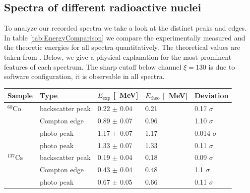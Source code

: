 \subsection*{Spectra of different radioactive nuclei}
%
To analyze our recorded spectra we take a look at the distinct peaks and edges.
In table \ref{tab:EnergyComparison} we compare the experimentally measured and the theoretic energies for all spectra quantitatively.
The theoretical values are taken from \cite{Anleitung}.
Below, we give a physical explanation for the most prominent features of each spectrum.
The sharp cutoff below channel $\xi = 130$ is due to software configuration, it is observable in all spectra.
%
\par
%
\minipage{\linewidth}
    \begin{center}
        \captionsetup{type=table}
        \begin{adjustbox}{max width=\linewidth, keepaspectratio}
            \begin{tabular}{lllll}
            \toprule
            Sample            & Type             & $E_{\text{exp}}$ [\SI{}{\mega\electronvolt}] & $E_{\text{theo}}$ [\SI{}{\mega\electronvolt}] & Deviation      \\
            \midrule
            $^{60}\text{Co}$  & backscatter peak & 0.22 $\pm$ 0.04                              & 0.21                                          & 0.17  $\sigma$ \\
            ~                 & Compton edge     & 0.89 $\pm$ 0.07                              & 0.96                                          & 1.10   $\sigma$ \\
            ~                 & photo peak       & 1.17 $\pm$ 0.07                              & 1.17                                          & 0.014 $\sigma$ \\
            ~                 & photo peak       & 1.33 $\pm$ 0.07                              & 1.33                                          & 0.11  $\sigma$ \\
            $^{137}\text{Cs}$ & backscatter peak & 0.19 $\pm$ 0.04                              & 0.18                                          & 0.09 $\sigma$ \\
            ~                 & Compton edge     & 0.43 $\pm$ 0.04                              & 0.48                                          & 1.1   $\sigma$ \\
            ~                 & photo peak       & 0.67 $\pm$ 0.05                              & 0.66                                          & 0.11  $\sigma$ \\

\end{tabular}
\end{adjustbox}
\end{center}

